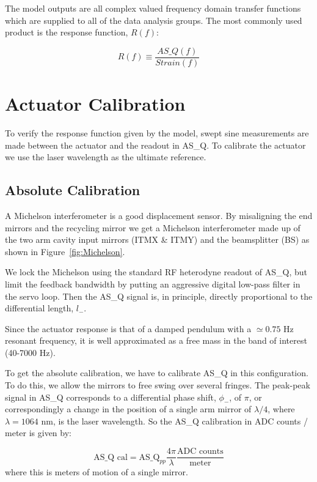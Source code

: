 The model outputs are all complex valued frequency domain transfer functions which
are supplied to all of the data analysis groups. The most commonly used product is
the response function, $R(f)$:

\begin{equation}
R(f) \equiv \frac{AS\_Q(f)}{Strain(f)}
\end{equation}


\section{Actuator Calibration}

To verify the response function given by the model, swept sine measurements are
made between the actuator and the readout in AS\_Q. To calibrate the actuator
we use the laser wavelength as the ultimate reference.

\subsection{Absolute Calibration}

A Michelson interferometer is a good displacement sensor. By misaligning the
end mirrors and the recycling mirror we get a Michelson interferometer made up
of the two arm cavity input mirrors (ITMX \& ITMY) and the beamsplitter (BS)
as shown in Figure~\ref{fig:Michelson}.

We lock the Michelson using the standard RF heterodyne readout of AS\_Q, but
limit the feedback bandwidth by putting an aggressive digital low-pass
filter in the servo loop. Then the AS\_Q signal is, in principle, directly
proportional to the differential length, $l_-$.

Since the actuator response is that of a damped pendulum with a 
$\simeq0.75$ Hz resonant frequency, it is well approximated as a
free mass in the band of interest (40-7000 Hz).

To get the absolute calibration, we have to calibrate AS\_Q in this configuration. 
To do this, we allow the mirrors to free
swing over several fringes. The peak-peak signal in AS\_Q corresponds
to a differential phase shift, $\phi_-$, of $\pi$, or correspondingly
a change in the position of a single arm mirror of $\lambda/4$, where
$\lambda = 1064$ nm, is the laser wavelength. 
So the AS\_Q calibration in ADC counts / meter is given by:

\begin{equation}
\mbox{AS\_Q cal} = \mbox{AS\_Q}_{pp}\frac{4 \pi}{\lambda} \frac{\mbox{ADC counts}}{\mbox{meter}}
\end{equation}
where this is meters of motion of a single mirror.

